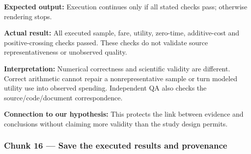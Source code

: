 \documentclass[
]{article}
\newenvironment{Shaded}{\begin{snugshade}}{\end{snugshade}}
\newcommand{\DecValTok}[1]{\textcolor[rgb]{0.00,0.00,0.81}{#1}}
\newcommand{\FunctionTok}[1]{\textcolor[rgb]{0.13,0.29,0.53}{\textbf{#1}}}
\newcommand{\NormalTok}[1]{#1}
\newcommand{\OtherTok}[1]{\textcolor[rgb]{0.56,0.35,0.01}{#1}}
\newcommand{\SpecialCharTok}[1]{\textcolor[rgb]{0.81,0.36,0.00}{\textbf{#1}}}
\newcommand{\StringTok}[1]{\textcolor[rgb]{0.31,0.60,0.02}{#1}}
\begin{document}
\begin{Shaded}
\end{Shaded}

\textbf{Expected output:} Execution continues only if all stated checks
pass; otherwise rendering stops.

\textbf{Actual result:} All executed sample, fare, utility, zero-time,
additive-cost and positive-crossing checks passed. These checks do not
validate source representativeness or unobserved quality.

\textbf{Interpretation:} Numerical correctness and scientific validity
are different. Correct arithmetic cannot repair a nonrepresentative
sample or turn modeled utility use into observed spending. Independent
QA also checks the source/code/document correspondence.

\textbf{Connection to our hypothesis:} This protects the link between
evidence and conclusions without claiming more validity than the study
design permits.

\subsubsection{Chunk 16 --- Save the executed results and
provenance}\label{chunk-16-save-the-executed-results-and-provenance}
\end{document}

